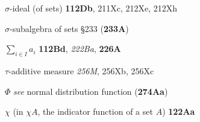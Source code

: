 

{$\sigma$-ideal }
(of sets) {\bf 112Db},
  211Xc, 212Xe, 212Xh




























$\sigma$-subalgebra of sets \S233 ({\bf 233A})






\indexmedskip
\indexheader{$\scriptstyle\pmb{\Sigma}$}







$\sum_{i\in I}a_i$ {\bf 112Bd}, {\it 222Ba}, {\bf 226A}
  

\indexmedskip
\indexheader{$\scriptstyle\pmb{\tau}$}





$\tau$-additive measure {\it 256M}, 256Xb, 256Xc

























\indexmedskip
\indexiiheader{$\scriptstyle\pmb{\Phi}$}

$\Phi$ {\it see} normal distribution function ({\bf 274Aa})


\indexmedskip
\indexheader{$\scriptstyle\pmb{\chi}$}

$\chi$ (in $\chi A$, the indicator function of a set $A$)
{\bf 122Aa}





